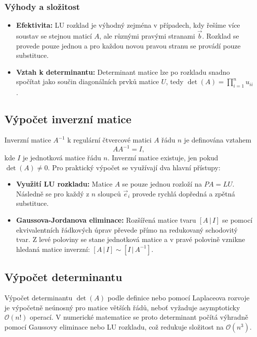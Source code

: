 \subsubsection{Výhody a složitost}
\begin{itemize}
    \item \textbf{Efektivita:} LU rozklad je výhodný zejména v případech, kdy řešíme více soustav se stejnou maticí $A$, ale různými pravými stranami $\vec{b}$. Rozklad se provede pouze jednou a pro každou novou pravou stranu se provádí pouze substituce.
    \item \textbf{Vztah k determinantu:} Determinant matice lze po rozkladu snadno spočítat jako součin diagonálních prvků matice $U$, tedy $\det(A) = \prod_{i=1}^n u_{ii}$.
\end{itemize}

\subsection{Výpočet inverzní matice}

Inverzní matice $A^{-1}$ k regulární čtvercové matici $A$ řádu $n$ je definována vztahem 
\[
A A^{-1} = I,
\]
kde $I$ je jednotková matice řádu $n$.
Inverzní matice existuje, jen pokud $\det(A) \neq 0$.
Pro praktický výpočet se využívají dva hlavní přístupy:
\begin{itemize}
    \item \textbf{Využití LU rozkladu:} Matice $A$ se pouze jednou rozloží na $PA = LU$. Následně se pro každý z $n$ sloupců $\vec{e}_i$ provede rychlá dopředná a zpětná substituce.
    \item \textbf{Gaussova-Jordanova eliminace:} Rozšířená matice tvaru $[A \,|\, I]$ se pomocí ekvivalentních řádkových úprav převede přímo na redukovaný schodovitý tvar. Z levé poloviny se stane jednotková matice a v pravé polovině vznikne hledaná matice inverzní: $[A \,|\, I] \sim [I \,|\, A^{-1}]$.
\end{itemize}

\subsection{Výpočet determinantu}

Výpočet determinantu $\det(A)$ podle definice nebo pomocí Laplaceova rozvoje je výpočetně neúnosný pro matice větších řádů, neboť vyžaduje asymptoticky $\mathcal{O}(n!)$ operací. V numerické matematice se proto determinant počítá výhradně pomocí Gaussovy eliminace nebo LU rozkladu, což redukuje složitost na $\mathcal{O}(n^3)$.

